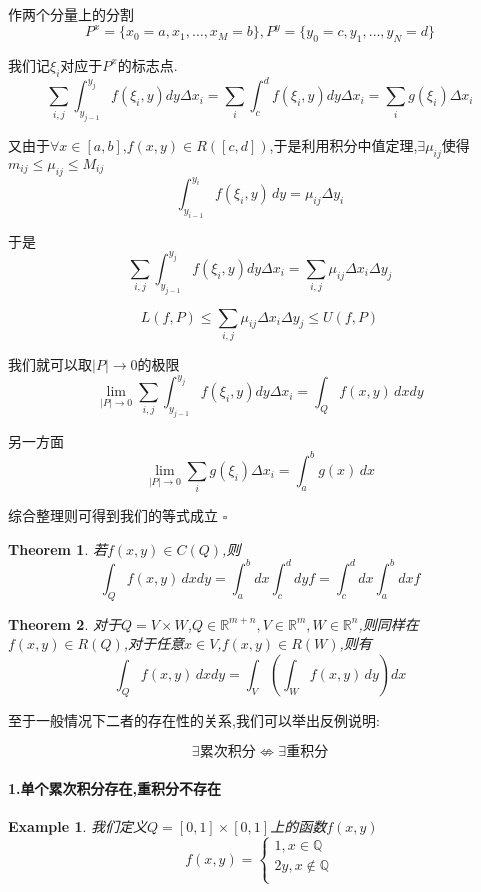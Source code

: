 \documentclass[11pt,hyperref,a4paper,UTF8]{ctexart}
\newtheorem{theorem}{Theorem}[subsection]
\newtheorem{example}{Example}[subsection]
\newenvironment{cproof}{%
\heiti{证明}\kaishu
}{%
  \hfill $\square$
  \par\bigskip
}
\newcommand{\RR}{\mathbb{R}}
\newcommand{\QQ}{\mathbb{Q}}
\newcommand{\parameter}[1]{\left(#1\right)}
\begin{document}
\begin{CJK}{UTF8}{gkai}
\begin{cproof}
  作两个分量上的分割
  \[P^x = \{x_0 = a,x_1,\ldots,x_M = b\},P^y = \{y_0 = c,y_1,\ldots,y_N = d\}\]

  我们记$\xi_i$对应于$P^x$的标志点.
  \[\sum_{i,j}\int_{y_{j - 1}}^{y_j} f(\xi_i,y)dy \Delta x_i = \sum_{i} \int_{c}^{d} f(\xi_i,y)dy \Delta x_i = \sum_{i} g(\xi_i) \Delta x_i\]

  又由于$\forall x \in [a,b]$,$f(x,y) \in R([c,d])$,于是利用积分中值定理,$\exists \mu_{ij}$使得$m_{ij} \leq \mu_{ij} \leq M_{ij}$
  \[\int_{y_{i - 1}}^{y_i}f(\xi_i,y)\, dy = \mu_{ij} \Delta y_i\]

  于是
  \[\sum_{i,j}\int_{y_{j - 1}}^{y_j} f(\xi_i,y)dy \Delta x_i = \sum_{i,j} \mu_{ij} \Delta x_i \Delta y_j\]

  \[L(f,P) \leq \sum_{i,j} \mu_{ij} \Delta x_i \Delta y_j \leq U(f,P)\]

  我们就可以取$|P| \to 0$的极限
  \[\lim_{|P|\to 0} \sum_{i,j}\int_{y_{j - 1}}^{y_j} f(\xi_i,y)dy \Delta x_i = \int_{Q} f(x,y)\, dx dy\]

  另一方面
  \[\lim_{|P| \to 0}\sum_{i} g(\xi_i) \Delta x_i = \int_{a}^{b} g(x) \,dx\]

  综合整理则可得到我们的等式成立
\end{cproof}

\begin{theorem}
  若$f(x,y) \in C(Q)$,则
  \[\int_{Q} f(x,y)\, dx dy = \int_{a}^{b}dx\int_{c}^{d}dy f =  \int_{c}^{d}dx\int_{a}^{b}dx f\]
\end{theorem}

\begin{theorem}
  对于$Q = V \times W$,$Q \in \RR^{m + n}, V \in \RR^m,W \in \RR^n$,则同样在$f(x,y) \in R(Q)$,对于任意$x \in V$,$f(x,y) \in R(W)$,则有
  \[\int_{Q} f(x,y)\, dx dy = \int_{V} \parameter{\int_{W} f(x,y)\, dy}dx\]
\end{theorem}

至于一般情况下二者的存在性的关系,我们可以举出反例说明:

\[\exists \text{累次积分} \nLeftrightarrow \exists \text{重积分}\]

\paragraph{1.单个累次积分存在,重积分不存在}
\begin{example}
  我们定义$Q = [0,1]\times [0,1]$上的函数$f(x,y)$
  \[f(x,y) = \begin{cases}
    1, x \in \QQ\\
    2y, x \notin \QQ\\
  \end{cases}\]


\end{example}
\end{CJK}
\end{document}
